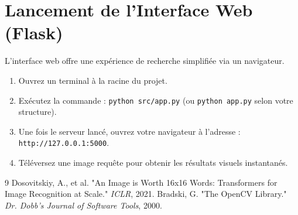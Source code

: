 \documentclass[a4paper,12pt]{report}%
\begin{document}
\section{Lancement de l'Interface Web (Flask)}
L'interface web offre une expérience de recherche simplifiée via un navigateur.
\begin{enumerate}
    \item Ouvrez un terminal à la racine du projet.
    \item Exécutez la commande : \texttt{python src/app.py} (ou \texttt{python app.py} selon votre structure).
    \item Une fois le serveur lancé, ouvrez votre navigateur à l'adresse : \texttt{http://127.0.0.1:5000}.
    \item Téléversez une image requête pour obtenir les résultats visuels instantanés.
\end{enumerate}

\begin{thebibliography}{9}
 Dosovitskiy, A., et al. "An Image is Worth 16x16 Words: Transformers for Image Recognition at Scale." \textit{ICLR}, 2021.
 Bradski, G. "The OpenCV Library." \textit{Dr. Dobb's Journal of Software Tools}, 2000.
\end{thebibliography}
\end{document}
